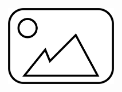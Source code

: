 \documentclass[aspectratio=169,10pt]{beamer}
\begin{document}
\begin{frame}
    \begin{figure}
        \centering
        \includegraphics[height=2cm]{placeholder.png}
    \end{figure}

\end{frame}
\end{document}
